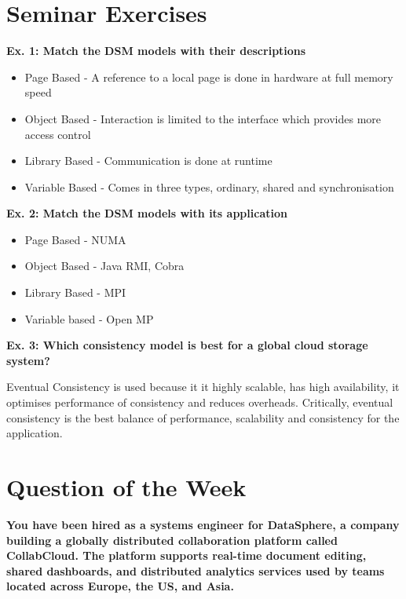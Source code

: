 
\section{Seminar Exercises}
\textbf{Ex. 1: Match the DSM models with their descriptions}
\begin{itemize}
    \item Page Based - A reference to a local page is done in hardware at full memory speed
    \item Object Based - Interaction is limited to the interface which provides more access control
    \item Library Based - Communication is done at runtime
    \item Variable Based - Comes in three types, ordinary, shared and synchronisation
\end{itemize}

\textbf{Ex. 2: Match the DSM models with its application}
\begin{itemize}
    \item Page Based - NUMA
    \item Object Based - Java RMI, Cobra
    \item Library Based - MPI
    \item Variable based - Open MP
\end{itemize}

\textbf{Ex. 3: Which consistency model is best for a global cloud storage system?}

Eventual Consistency is used because it it highly scalable, has high availability, it optimises performance of consistency and reduces overheads. Critically, eventual consistency is the best balance of performance, scalability and consistency for the application.

\section{Question of the Week}
\textbf{You have been hired as a systems engineer for DataSphere, a company building a globally distributed collaboration platform called CollabCloud. The platform supports real-time document editing, shared dashboards, and distributed analytics services used by teams located across Europe, the US, and Asia.}

